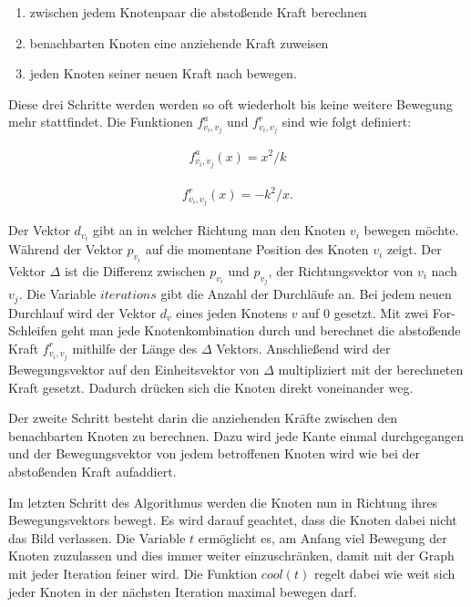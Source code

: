 \begin{enumerate}
	\item zwischen jedem Knotenpaar die abstoßende Kraft berechnen
	\item benachbarten Knoten eine anziehende Kraft zuweisen
	\item jeden Knoten seiner neuen Kraft nach bewegen.
\end{enumerate} 
Diese drei Schritte werden werden so oft wiederholt bis keine weitere Bewegung mehr stattfindet.
Die Funktionen \begin{math} f^{a}_{v_{i},v_{j}} \end{math} und \begin{math} f^{r}_{v_{i},v_{j}} \end{math} sind wie folgt definiert:

   
	\begin{align*}
		f^{a}_{v_{i},v_{j}} (x) =
			x^{2}/k
	\end{align*}
    
    \begin{align}
		f^{r}_{v_{i},v_{j}} (x) =
		-k^{2}/x.
    \end{align}
    
Der Vektor $d_{v_{i}}$ gibt an in welcher Richtung man den Knoten $v_{i}$ bewegen möchte. Während der Vektor $p_{v_{i}}$ auf die momentane Position des Knoten $v_{i}$ zeigt. Der Vektor $\Delta$ ist die Differenz zwischen $p_{v_{i}}$ und $p_{v_{j}}$, der Richtungsvektor von $v_{i}$ nach $v_{j}$. Die Variable $iterations$ gibt die Anzahl der Durchläufe an. Bei jedem neuen Durchlauf wird der Vektor  $d_{v}$  eines jeden Knotens $v$ auf 0 gesetzt. Mit zwei For-Schleifen geht man jede Knotenkombination durch und berechnet die abstoßende Kraft $f^{r}_{v_{i},v_{j}}$ mithilfe der Länge des $\Delta$ Vektors. Anschließend wird der Bewegungsvektor auf den Einheitsvektor von $\Delta$ multipliziert mit der berechneten Kraft gesetzt. Dadurch drücken sich die Knoten direkt voneinander weg.

Der zweite Schritt besteht darin die anziehenden Kräfte zwischen den benachbarten Knoten zu berechnen. Dazu wird jede Kante einmal durchgegangen und der Bewegungsvektor von jedem betroffenen Knoten wird wie bei der abstoßenden Kraft aufaddiert. 

Im letzten Schritt des Algorithmus werden die Knoten nun in Richtung ihres Bewegungsvektors bewegt. Es wird darauf geachtet, dass die Knoten dabei nicht das Bild verlassen. Die Variable $t$ ermöglicht es, am Anfang viel Bewegung der Knoten zuzulassen und dies immer weiter einzuschränken, damit mit der Graph mit jeder Iteration feiner wird. Die Funktion $cool(t)$ regelt dabei wie weit sich jeder Knoten in der nächsten Iteration maximal bewegen darf.

